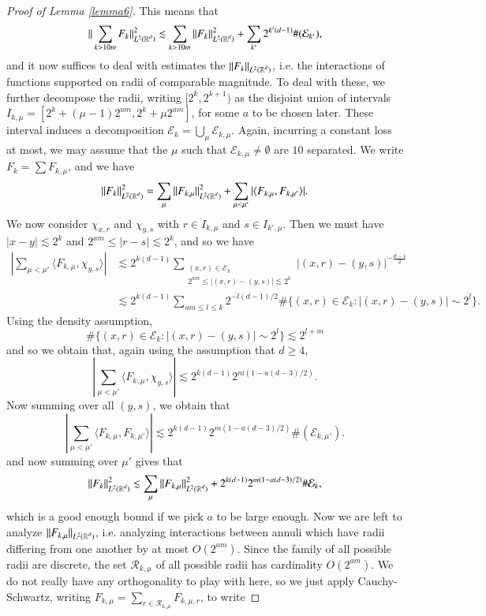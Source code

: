 \begin{proof}[Proof of Lemma \ref{lemma6}]
    This means that
    \[ \| \sum_{k > 10m} F_k \|_{L^2(\operatorname{\mathbb{R}}^d)}^2 \lesssim \sum_{k > 10m} \| F_k \|_{L^2(\operatorname{\mathbb{R}}^d)}^2 + \sum_{k'} 2^{k'(d-1)} \# (\mathcal{E}_{k'}), \]
    and it now suffices to deal with estimates the $\| F_k \|_{L^2(\operatorname{\mathbb{R}}^d)}$, i.e. the interactions of functions supported on radii of comparable magnitude. To deal with these, we further decompose the radii, writing $[2^k,2^{k+1})$ as the disjoint union of intervals $I_{k,\mu} = [2^k + (\mu - 1) 2^{am}, 2^k + \mu 2^{am}]$, for some $a$ to be chosen later. These interval induces a decomposition $\mathcal{E}_k = \bigcup_\mu \mathcal{E}_{k,\mu}$. Again, incurring a constant loss at most, we may assume that the $\mu$ such that $\mathcal{E}_{k,\mu} \neq \emptyset$ are $10$ separated. We write $F_k = \sum F_{k,\mu}$, and we have
    \[ \| F_k \|_{L^2(\operatorname{\mathbb{R}}^d)}^2 = \sum_\mu \| F_{k,\mu} \|_{L^2(\operatorname{\mathbb{R}}^d)}^2 + \sum_{\mu < \mu'} |\langle F_{k,\mu}, F_{k,\mu'} \rangle|. \]
    We now consider $\chi_{x,r}$ and $\chi_{y,s}$ with $r \in I_{k,\mu}$ and $s \in I_{k',\mu}$. Then we must have $|x - y| \lesssim 2^k$ and $2^{am} \leq |r - s| \lesssim 2^k$, and so we have
    \begin{align*}
        |\sum_{\mu < \mu'} \langle F_{k,\mu}, \chi_{y,s} \rangle| &\lesssim 2^{k(d-1)} \sum_{\substack{(x,r) \in \mathcal{E}_k\\ 2^{am} \leq |(x,r) - (y,s)| \lesssim 2^k}} |(x,r) - (y,s)|^{- \frac{d-1}{2}}\\
        &\lesssim 2^{k(d-1)} \sum_{am \leq l \leq k} 2^{-l(d-1)/2} \# \{ (x,r) \in \mathcal{E}_k: |(x,r) - (y,s)| \sim 2^l \}.
    \end{align*}
    Using the density assumption,
    \[ \# \{ (x,r) \in \mathcal{E}_k: |(x,r) - (y,s)| \sim 2^l \} \lesssim 2^{l + m} \]
    and so we obtain that, again using the assumption that $d \geq 4$,
    \[ |\sum_{\mu < \mu'} \langle F_{k,\mu}, \chi_{y,s} \rangle| \lesssim 2^{k(d-1)} 2^{m(1-a(d-3)/2)}. \]
    Now summing over all $(y,s)$, we obtain that
    \[ |\sum_{\mu < \mu'} \langle F_{k,\mu}, F_{k,\mu'} \rangle| \lesssim 2^{k(d-1)} 2^{m(1 - a(d-3)/2)} \#(\mathcal{E}_{k,\mu'}). \]
    and now summing over $\mu'$ gives that
    \[ \| F_k \|_{L^2(\operatorname{\mathbb{R}}^d)}^2 \lesssim \sum_\mu \| F_{k,\mu} \|_{L^2(\operatorname{\mathbb{R}}^d)}^2 + 2^{k(d-1)} 2^{m(1 - a(d-3)/2)} \# \mathcal{E}_k, \]
    which is a good enough bound if we pick $a$ to be large enough. Now we are left to analyze $\| F_{k,\mu} \|_{L^2(\operatorname{\mathbb{R}}^d)}$, i.e. analyzing interactions between annuli which have radii differing from one another by at most $O(2^{am})$. Since the family of all possible radii are discrete, the set $\mathcal{R}_{k,\mu}$ of all possible radii has cardinality $O(2^{am})$. We do not really have any orthogonality to play with here, so we just apply Cauchy-Schwartz, writing $F_{k,\mu} = \sum_{r \in \mathcal{R}_{k,\mu}} F_{k,\mu,r}$, to write

\end{proof}
